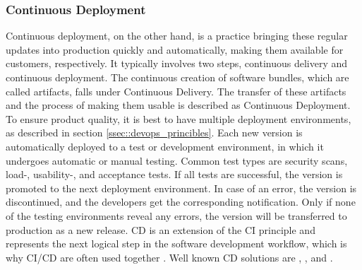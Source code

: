         \subsubsection{Continuous Deployment}
        Continuous deployment, on the other hand, is a practice bringing these regular updates into production quickly and automatically, making them available for customers, respectively. It typically involves two steps, continuous delivery and continuous deployment. The continuous creation of software bundles, which are called artifacts, falls under Continuous Delivery. The transfer of these artifacts and the process of making them usable is described as Continuous Deployment. To ensure product quality, it is best to have multiple deployment environments, as described in section \ref{ssec::devops_princibles}. Each new version is automatically deployed to a test or development environment, in which it undergoes automatic or manual testing. Common test types are security scans, load-, usability-, and acceptance tests. If all tests are successful, the version is promoted to the next deployment environment. In case of an error, the version is discontinued, and the developers get the corresponding notification. Only if none of the testing environments reveal any errors, the version will be transferred to production as a new release. \ac{CD} is an extension of the \ac{CI} principle and represents the next logical step in the software development workflow, which is why \ac{CI}/\ac{CD} are often used together \cite{azuredevops}. Well known \ac{CD} solutions are , ,  and .

